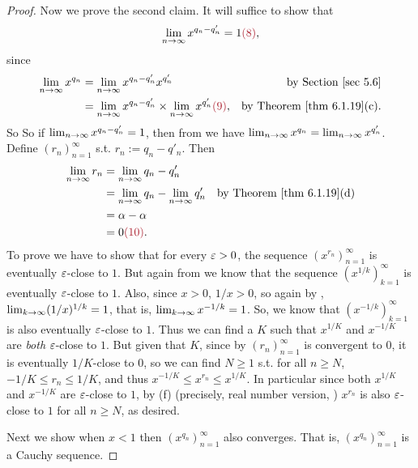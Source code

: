 \begin{proof}
Now we prove the second claim.
It will suffice to show that
\[
    \lim_{n \toINF} x^{q_n - q'_n} = 1 \MAROON{(8)},
\]
since
\begin{align*}
    \lim_{n \toINF} x^{q_n} & = \lim_{n \toINF} x^{q_n - q'_n} x^{q'_n} & \text{by \SEC{5.6}} \\
                            & = \lim_{n \toINF} x^{q_n - q'_n} \X \lim_{n \toINF} x^{q'_n} \MAROON{(9)}, & \text{by \THM{6.1.19}(c)}.
\end{align*}
So So if \(\lim_{n \to \infty} x^{q_n - q'_n} = 1\),
then from  we have \(\lim_{n \to \infty} x^{q_n} = \lim_{n \to \infty} x^{q'_n}\).
Define \((r_n)_{n = 1}^{\infty}\) s.t. \(r_n := q_n - q'_n\).
Then
\begin{align*}
    \lim_{n \toINF} r_n & = \lim_{n \toINF} q_n - q'_n \\
                        & = \lim_{n \toINF} q_n - \lim_{n \toINF} q'_n & \text{by \THM{6.1.19}(d)} \\
                        & = \alpha - \alpha \\
                        & = 0 \MAROON{(10)}.
\end{align*}
To prove  we have to show that for every \(\varepsilon > 0\), the sequence \((x^{r_n})_{n = 1}^{\infty}\) is eventually \(\varepsilon\)-close to \(1\).
But again from  we know that the sequence \((x^{1/k})_{k = 1}^{\infty}\) is eventually \(\varepsilon\)-close to \(1\).
Also, since \(x > 0\), \(1/x > 0\), so again by , \(\lim_{k \to \infty} (1/x)^{1/k} = 1\), that is, \(\lim_{k \to \infty} x^{-1/k} = 1\).
So, we know that \((x^{-1/k})_{k = 1}^{\infty}\) is also eventually \(\varepsilon\)-close to \(1\).
Thus we can find a \(K\) such that \(x^{1/K}\) and \(x^{-1/K}\) are \emph{both} \(\varepsilon\)-close to \(1\).
But given that \(K\), since by  \((r_n)_{n = 1}^{\infty}\) is convergent to \(0\), it is eventually \(1/K\)-close to 0,
so we can find \(N \ge 1\) s.t. for all \(n \ge N\), \(-1/K \le r_n \le 1/K\), and thus \(x^{-1/K} \le x^{r_n} \le x^{1/K}\).
In particular since both \(x^{1/K}\) and \(x^{-1/K}\) are \(\varepsilon\)-close to \(1\), by (f) (precisely, real number version, ) \(x^{r_n}\) is also \(\varepsilon\)-close to \(1\) for all \(n \ge N\), as desired.

Next we show when \(x < 1\) then \((x^{q_n})_{n = 1}^{\infty}\) also converges.
That is, \((x^{q_n})_{n = 1}^\infty\) is a Cauchy sequence.


\end{proof}
